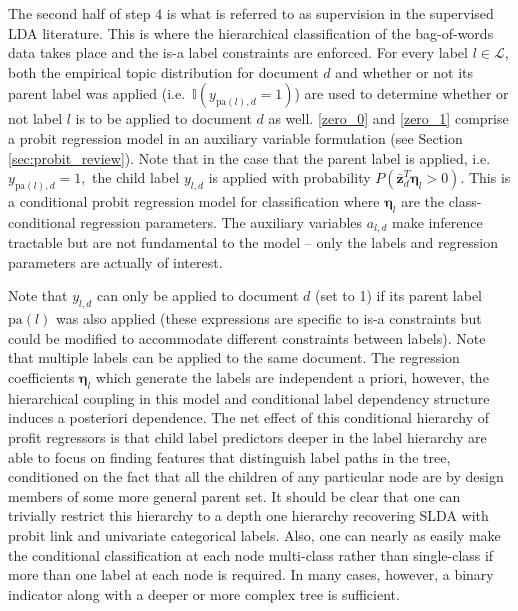 The second half of step 4 is what is referred to as supervision in the supervised LDA literature.  This is where the hierarchical classification of the bag-of-words data takes place and the is-a label constraints are enforced.  For every label $l \in \mathcal{L}$, both the empirical topic distribution for document $d$ and whether or not its parent label was applied (i.e.~$\mathbb{I}(y_{\mathrm{pa}(l),d}=1)$) are used to determine whether or not  label $l$ is to be applied to  document $d$ as well.    \eqref{zero_0} and \eqref{zero_1} comprise a probit regression model in an auxiliary variable formulation (see Section \ref{sec:probit_review}).   Note that in the case that the parent label is applied, i.e.~$y_{\mathrm{pa}(l),d}=1,$ the child label $y_{l,d}$ is applied with probability $P(\bar{\mathbf{z}}^{T}_d\boldsymbol\eta_{l}>0).$  This is a conditional probit regression model for classification where $\boldsymbol\eta_l$ are the class-conditional regression parameters.  The auxiliary variables $a_{l,d}$ make inference tractable but are not fundamental to the model -- only the labels and regression parameters are actually of interest.

Note that $y_{l,d}$ can only be applied to document $d$  (set to 1) if its parent label $\mathrm{pa}(l)$ was also applied (these expressions are specific to is-a constraints but could be modified to accommodate different constraints between labels).  Note that multiple labels can be applied to the same document.  The regression coefficients $\boldsymbol\eta_l$ which generate the labels are independent a priori, however, the hierarchical coupling in this model and conditional label dependency structure induces a posteriori dependence.   The net effect of this conditional hierarchy of profit regressors is that child label predictors deeper in the label hierarchy are able to focus on finding features that distinguish label paths in the tree, conditioned on the fact that all the children of any particular node are by design members of some more general parent set.  It should be clear that one can trivially restrict this hierarchy to a depth one hierarchy recovering SLDA with probit link and univariate categorical labels.  Also, one can nearly as easily make the conditional classification at each node multi-class rather than single-class if more than one label at each node is required.  In many cases, however, a binary indicator along with a deeper or more complex tree is sufficient.

